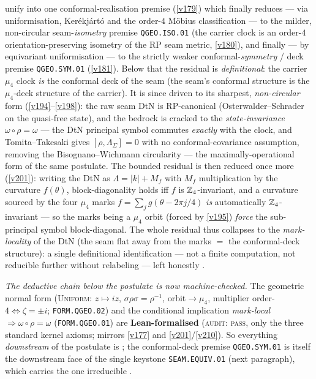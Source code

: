 \begin{keybox}
unify into one conformal-realisation premise (\vref{v179}) which finally reduces --- via uniformisation,
Ker\'ekj\'art\'o and the order-$4$ M\"obius classification --- to the milder, non-circular
seam-\emph{isometry} premise \texttt{QGEO.ISO.01} (the carrier clock is an order-$4$
orientation-preserving isometry of the RP seam metric, \vref{v180}), and finally --- by equivariant
uniformisation --- to the strictly weaker conformal-\emph{symmetry} / deck premise \texttt{QGEO.SYM.01}
(\vref{v181}). Below that the residual is \emph{definitional}: the carrier $\mu_4$ clock \emph{is} the
conformal deck of the seam (the seam's conformal structure is the $\mu_4$-deck structure of the carrier).
It is since driven to its sharpest, \emph{non-circular} form (\vref{v194}--\vref{v198}): the raw seam DtN
is RP-canonical (Osterwalder--Schrader on the quasi-free state), and the bedrock is cracked to the
\emph{state-invariance} $\omega\circ\rho=\omega$ --- the DtN principal symbol commutes \emph{exactly} with
the clock, and Tomita--Takesaki gives $[\rho,\Lambda_\Sigma]=0$ with no conformal-covariance assumption,
removing the Bisognano--Wichmann circularity --- the maximally-operational form of the same postulate.
The bounded residual is then reduced once more (\vref{v201}): writing the DtN as $\Lambda=|k|+M_f$ with
$M_f$ multiplication by the curvature $f(\theta)$, block-diagonality holds iff $f$ is $\mathbb Z_4$-invariant, and a
curvature sourced by the four $\mu_4$ marks $f=\sum_{j}g(\theta-2\pi j/4)$ \emph{is} automatically
$\mathbb Z_4$-invariant --- so the marks being a $\mu_4$ orbit (forced by \vref{v195}) \emph{force} the
sub-principal symbol block-diagonal. The whole residual thus collapses to the \emph{mark-locality} of the
DtN (the seam flat away from the marks $=$ the conformal-deck structure): a single definitional
identification --- not a finite computation, not reducible further without relabeling --- left honestly \mO.
\par\smallskip\noindent\emph{The deductive chain below the postulate is now machine-checked.} The
geometric normal form (\textsc{Uniform}: $z\mapsto iz$, $\sigma\rho\sigma=\rho^{-1}$, orbit$\to\mu_4$,
multiplier order-$4\Leftrightarrow\zeta{=}\pm i$; \texttt{FORM.QGEO.02}) and the conditional implication
\emph{mark-local}$\Rightarrow\omega\circ\rho=\omega$ (\texttt{FORM.QGEO.01}) are \textbf{Lean-formalised}
(\textsc{audit: pass}, only the three standard kernel axioms; mirrors \vref{v177} and \vref{v201}/\vref{v210}).
So everything \emph{downstream} of the postulate is \mE; the conformal-deck premise \texttt{QGEO.SYM.01} is
itself the downstream face of the single keystone \texttt{SEAM.EQUIV.01} (next paragraph), which carries the
one irreducible \mO.
\end{keybox}

